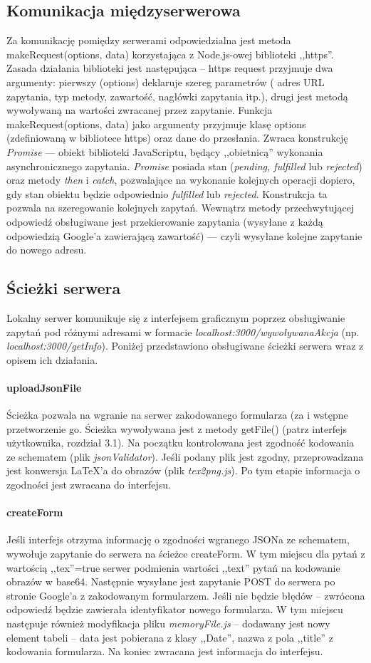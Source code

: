 \subsection{Komunikacja międzyserwerowa}
Za komunikację pomiędzy serwerami odpowiedzialna jest metoda makeRequest(options, data) korzystająca z Node.js-owej biblioteki ,,https''. Zasada działania biblioteki jest następująca -- https request przyjmuje dwa argumenty: pierwszy (options) deklaruje szereg parametrów ( adres URL zapytania, typ metody, zawartość, nagłówki zapytania itp.), drugi jest metodą wywoływaną na wartości zwracanej przez zapytanie. 
\ind Funkcja makeRequest(options, data) jako argumenty przyjmuje klasę options (zdefiniowaną w bibliotece https) oraz dane do przesłania. Zwraca konstrukcję \textit{Promise} --- obiekt biblioteki JavaScriptu, będący ,,obietnicą'' wykonania asynchronicznego zapytania. \textit{Promise} posiada stan (\textit{pending, fulfilled} lub \textit{rejected}) oraz metody \textit{then} i \textit{catch}, pozwalające na wykonanie kolejnych operacji dopiero, gdy stan obiektu będzie odpowiednio \textit{fulfilled} lub \textit{rejected}. Konstrukcja ta pozwala na szeregowanie kolejnych zapytań. Wewnątrz metody przechwytującej odpowiedź obsługiwane jest przekierowanie zapytania (wysyłane z każdą odpowiedzią Google'a zawierającą zawartość) --- czyli wysyłane kolejne zapytanie do nowego adresu.
\subsection{Ścieżki serwera}
Lokalny serwer komunikuje się z interfejsem graficznym poprzez obsługiwanie zapytań pod różnymi adresami w formacie \textit{localhost:3000/wywoływanaAkcja} (np. \textit{localhost:3000/getInfo}).
Poniżej przedstawiono obsługiwane ścieżki serwera wraz z opisem ich działania.
\paragraph{uploadJsonFile} Ścieżka pozwala na wgranie na serwer zakodowanego formularza (za i wstępne przetworzenie go. Ścieżka wywoływana jest z metody getFile() (patrz interfejs użytkownika, rozdział 3.1). Na początku kontrolowana jest zgodność kodowania ze schematem (plik \textit{jsonValidator}). Jeśli podany plik jest zgodny, przeprowadzana jest konwersja \LaTeX{}'a do obrazów (plik \textit{tex2png.js}). Po tym etapie informacja o zgodności jest zwracana do interfejsu.
\paragraph{createForm} Jeśli interfejs otrzyma informację o zgodności wgranego JSONa ze schematem, wywołuje zapytanie do serwera na ścieżce createForm. W tym miejscu dla pytań z wartością ,,tex''=true serwer podmienia wartości ,,text'' pytań na kodowanie obrazów w base64. Następnie wysyłane jest zapytanie POST do serwera po stronie Google'a z zakodowanym formularzem. Jeśli nie będzie błędów -- zwrócona odpowiedź będzie zawierała identyfikator nowego formularza. W tym miejscu następuje również modyfikacja pliku \textit{memoryFile.js} -- dodawany jest nowy element tabeli -- data jest pobierana z klasy ,,Date'', nazwa z pola ,,title'' z kodowania formularza. Na koniec zwracana jest informacja do interfejsu.
